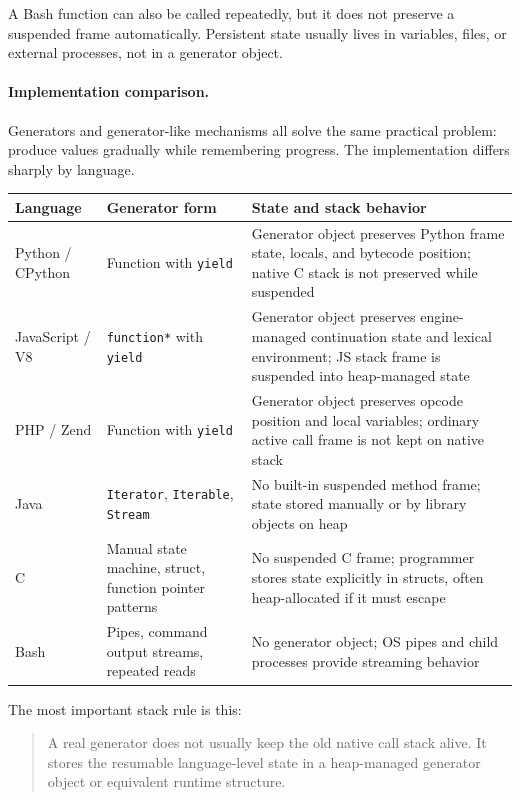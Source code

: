 A Bash function can also be called repeatedly, but it does not preserve a suspended frame automatically. Persistent state usually lives in variables, files, or external processes, not in a generator object.

\paragraph{Implementation comparison.}

Generators and generator-like mechanisms all solve the same practical problem: produce values gradually while remembering progress. The implementation differs sharply by language.

\begin{center}
\begin{tabular}{|p{}|p{}|p{}|}
\hline
\textbf{Language} & \textbf{Generator form} & \textbf{State and stack behavior} \\
\hline
Python / CPython & Function with \texttt{yield} & Generator object preserves Python frame state, locals, and bytecode position; native C stack is not preserved while suspended \\
\hline
JavaScript / V8 & \texttt{function*} with \texttt{yield} & Generator object preserves engine-managed continuation state and lexical environment; JS stack frame is suspended into heap-managed state \\
\hline
PHP / Zend & Function with \texttt{yield} & Generator object preserves opcode position and local variables; ordinary active call frame is not kept on native stack \\
\hline
Java & \texttt{Iterator}, \texttt{Iterable}, \texttt{Stream} & No built-in suspended method frame; state stored manually or by library objects on heap \\
\hline
C & Manual state machine, struct, function pointer patterns & No suspended C frame; programmer stores state explicitly in structs, often heap-allocated if it must escape \\
\hline
Bash & Pipes, command output streams, repeated reads & No generator object; OS pipes and child processes provide streaming behavior \\
\hline
\end{tabular}
\end{center}

The most important stack rule is this:

\begin{quote}
A real generator does not usually keep the old native call stack alive. It stores the resumable language-level state in a heap-managed generator object or equivalent runtime structure.
\end{quote}

